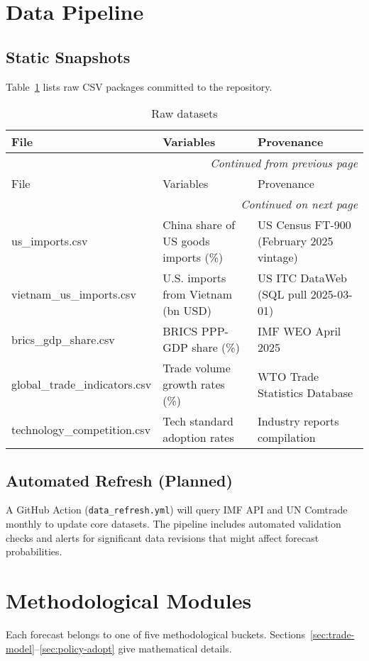 \documentclass{article}
\begin{document}
\section{Data Pipeline}
\subsection{Static Snapshots}
Table~\ref{tab:raw-data} lists raw CSV packages committed to the repository.
\begin{longtable}{@{}lll@{}}
\caption{Raw datasets}\label{tab:raw-data}\\
\toprule
File & Variables & Provenance \\
\midrule
\endfirsthead
\multicolumn{3}{r}{\textit{Continued from previous page}}\\
\toprule
File & Variables & Provenance \\
\midrule
\endhead
\midrule\multicolumn{3}{r}{\textit{Continued on next page}}\\\bottomrule\endfoot
us\_imports.csv & China share of US goods imports (\%) & US Census FT-900 (February 2025 vintage) \\
vietnam\_us\_imports.csv & U.S. imports from Vietnam (bn USD) & US ITC DataWeb (SQL pull 2025-03-01) \\
brics\_gdp\_share.csv & BRICS PPP-GDP share (\%) & IMF WEO April 2025 \\
global\_trade\_indicators.csv & Trade volume growth rates (\%) & WTO Trade Statistics Database \\
technology\_competition.csv & Tech standard adoption rates & Industry reports compilation \\
\bottomrule
\end{longtable}

\subsection{Automated Refresh (Planned)}
A GitHub Action (\texttt{data\_refresh.yml}) will query IMF API and UN Comtrade monthly to update core datasets. The pipeline includes automated validation checks and alerts for significant data revisions that might affect forecast probabilities.

\section{Methodological Modules}
Each forecast belongs to one of five methodological buckets.  Sections~\ref{sec:trade-model}–\ref{sec:policy-adopt} give mathematical details.
\end{document}
